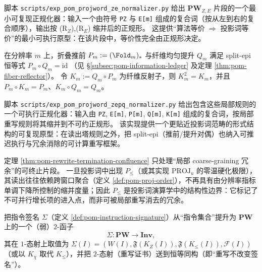 \begin{remark}\label{rem:pom-projword-normalizer-script}
脚本 \texttt{scripts/exp\_pom\_projword\_ze\_normalizer.py} 给出 $\mathbf{PW}_{Z,E}$ 片段的一个最小可复现正规化器：输入一个由符号 \texttt{PZ} 与 \texttt{E[m]} 组成的复合词（按从左到右的复合顺序），输出按 (R$_Z$),(R$_E$) 缩并后的正规形。
这提供“算法等价 \(\Rightarrow\) 投影词等价”的最小可执行原型：在该片段中，等价性完全由正规形决定。
\end{remark}

\begin{remark}\label{rem:pom-projword-zepq-normalizer-script}
在分辨率 \(m\) 上，折叠推前 \(P_m:=(\Fold_m)_*\) 与纤维均匀提升 \(Q_m\) 满足 split-epi 恒等式
\(
P_m\circ Q_m=\mathrm{id}
\)
（见 \S\ref{subsec:pom-information-ledger} 及定理 \ref{thm:pom-fiber-reflector}）。
令 \(K_m:=Q_m\circ P_m\) 为纤维反射子，则 \(K_m^2=K_m\)，并且 \(P_m\circ K_m=P_m\)、\(K_m\circ Q_m=Q_m\)。
\par
脚本 \texttt{scripts/exp\_pom\_projword\_zepq\_normalizer.py} 给出包含这些局部规则的一个可执行正规化器：输入由 \texttt{PZ}, \texttt{E[m]}, \texttt{P[m]}, \texttt{Q[m]}, \texttt{K[m]} 组成的复合词，按局部重写规则将其缩并到不可约正规形。
该实现提供一个更贴近投影词范畴的形式结构的可复现原型：在读出塔规则之外，把 split-epi（推前/提升对偶）也纳入可推迟执行与冗余消除的可计算重写框架。
\end{remark}

\begin{remark}[边界：序投影 \texorpdfstring{$P_{\le}$}{P<=} 不属于局部可消去片段]\label{rem:pom-rewrite-boundary-order}
定理 \ref{thm:pom-rewrite-termination-confluence} 只处理“局部 coarse-graining 冗余”的可终止片段。
一旦投影词中出现 $P_{\le}$（或其实现 $\mathrm{PROJ}_u$ 的零温硬化极限），其读出往往依赖跨窗口聚合（定义 \ref{def:pom-proj-order}），不再具有由分辨率指标单调下降所控制的缩并度量；因此 $P_{\le}$ 是投影词演算学中的结构性边界：它标记了不可并行增长项的进入点，而非可被局部重写消去的冗余。
\end{remark}

\begin{definition}[签名函子与投影门估价]\label{def:pom-sigma-functor}
把指令签名 $\Sigma$（定义 \ref{def:pom-instruction-signature}）从“指令集合”提升为 $\mathbf{PW}$ 上的一个（弱）$2$-函子
\[
\Sigma:\mathbf{PW}\to \mathbf{Inv},
\]
其在 $1$-态射上取值为
\(
\Sigma(I)=(W(I),\mathfrak F(K_Z(I)),\mathfrak F(K_{\le}(I)),\mathcal F(I))
\)
（或以 $K_\chi$ 取代 $K_{\le}$），并把 $2$-态射（重写证书）送到恒等同构（即“重写不改变签名”）。
\end{definition}

